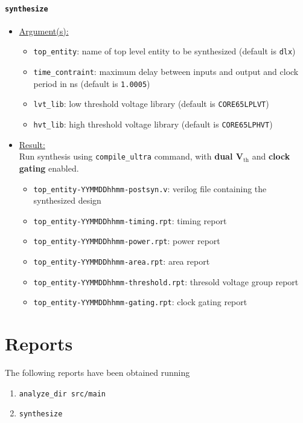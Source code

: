 \paragraph{\texttt{synthesize}}
\begin{itemize}
	\item \underline{Argument(s):}
		\begin{itemize}
			\item \texttt{top\_entity}: name of top level entity to
				be synthesized (default is \texttt{dlx})
			\item \texttt{time\_contraint}: maximum delay between
				inputs and output and clock period in ns
				(default is \texttt{1.0005})
			\item \texttt{lvt\_lib}: low threshold voltage library
				(default is \texttt{CORE65LPLVT})
			\item \texttt{hvt\_lib}: high threshold voltage library
				(default is \texttt{CORE65LPHVT})
		\end{itemize}
	\item \underline{Result:} \\
		Run synthesis using \texttt{compile\_ultra} command, with
		\textbf{dual V$_{\text{th}}$} and \textbf{clock gating} enabled.
		\begin{itemize}
			\item \texttt{top\_entity-YYMMDDhhmm-postsyn.v}: verilog
				file containing the synthesized design
			\item \texttt{top\_entity-YYMMDDhhmm-timing.rpt}: timing
				report
			\item \texttt{top\_entity-YYMMDDhhmm-power.rpt}: power
				report
			\item \texttt{top\_entity-YYMMDDhhmm-area.rpt}: area
				report
			\item \texttt{top\_entity-YYMMDDhhmm-threshold.rpt}:
				thresold voltage group report
			\item \texttt{top\_entity-YYMMDDhhmm-gating.rpt}: clock
				gating report
		\end{itemize}
\end{itemize}

\section{Reports}
The following reports have been obtained running
\begin{enumerate}
	\item \texttt{analyze\_dir src/main}
	\item \texttt{synthesize}
\end{enumerate}

